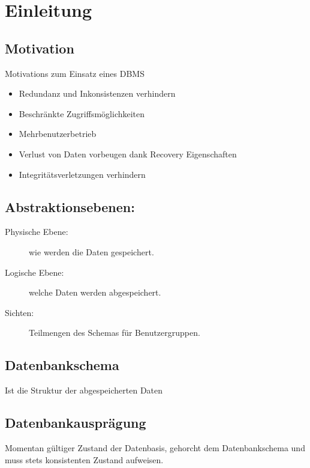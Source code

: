 \chapter{Einleitung} 
\section{Motivation}
Motivations zum Einsatz eines DBMS
\begin{itemize}
\item Redundanz und Inkonsistenzen verhindern
\item Beschränkte Zugriffsmöglichkeiten
\item Mehrbenutzerbetrieb
\item Verlust von Daten vorbeugen dank Recovery Eigenschaften 
\item Integritätsverletzungen verhindern
\end{itemize}

\section{Abstraktionsebenen:}

\begin{description}
\item[Physische Ebene:] wie werden die Daten gespeichert.
\item[Logische Ebene:] welche Daten werden abgespeichert. 
\item[Sichten:] Teilmengen des Schemas für Benutzergruppen. 
\end{description}

\section{Datenbankschema}
Ist die Struktur der abgespeicherten Daten

\section{Datenbankausprägung}
Momentan gültiger Zustand der Datenbasis, gehorcht dem Datenbankschema und muss stets konsistenten Zustand aufweisen. 
